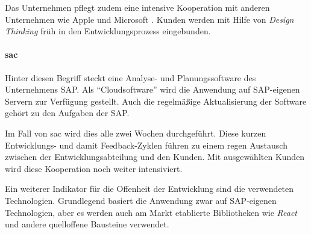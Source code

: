 Das Unternehmen pflegt zudem eine intensive Kooperation mit anderen Unternehmen
wie Apple \cite{Appleund81:online} und Microsoft \cite{Microsof58:online}.
Kunden werden mit Hilfe von \textit{Design Thinking} \cite{SAPDesig64:online} früh in den Entwicklungsprozess eingebunden.



\paragraph{\ac{sac}}\label{sec:beispiele-sap-sac}
Hinter diesen Begriff steckt eine Analyse- und Planungssoftware des Unternehmens SAP.
Als \enquote{Cloudsoftware} wird die Anwendung auf SAP-eigenen Servern zur Verfügung gestellt.
Auch die regelmäßige Aktualisierung der Software gehört zu den Aufgaben der SAP.

Im Fall von \ac{sac} wird dies alle zwei Wochen durchgeführt.
Diese kurzen Entwicklungs- und damit Feedback-Zyklen führen zu einem regen Austausch zwischen der Entwicklungsabteilung und den Kunden.
Mit ausgewählten Kunden wird diese Kooperation noch weiter intensiviert.

Ein weiterer Indikator für die Offenheit der Entwicklung sind die verwendeten Technologien.
Grundlegend basiert die Anwendung zwar auf SAP-eigenen Technologien,
aber es werden auch am Markt etablierte Bibliotheken wie \textit{React} und andere quelloffene Bausteine verwendet.
